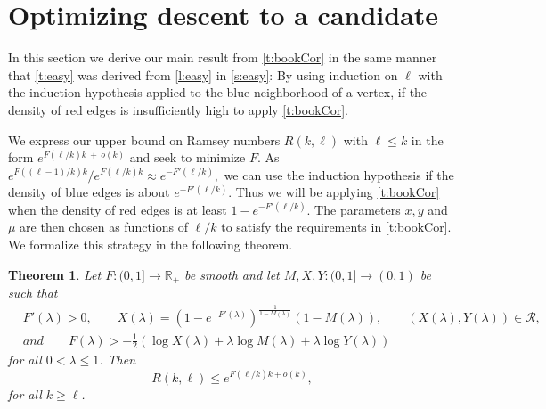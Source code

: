 \documentclass[reqno,final,12pt]{amsart}
\newtheorem{thm}{Theorem}
\newcommand{\mc}[1]{\mathcal{#1}}
\newcommand{\bb}[1]{\mathbb{#1}}
\newcommand{\s}[1]{\left(#1\right)}
\begin{document}
\section{Optimizing descent to a candidate}\label{s:opt}


In this section we derive our main result from \cref{t:bookCor} in the same manner that \cref{t:easy} was derived from \cref{l:easy} in \cref{s:easy}: By using induction on $\ell$ with the induction hypothesis applied to the blue neighborhood of a vertex, if the density of red edges is insufficiently high to apply  \cref{t:bookCor}.

We express our upper bound on Ramsey numbers $R(k,\ell)$ with $\ell \leq k$ in the form $e^{F(\ell/k)k~+~o(k)}$ and seek to minimize $F$. As $e^{F((\ell-1)/k)k}/e^{F(\ell/k)k} \approx e^{-F'(\ell/k)},$ we can use the induction hypothesis  if the density of blue edges is about $e^{-F'(\ell/k)}$. Thus we will be applying  \cref{t:bookCor} when the density of red edges is at least $1 - e^{-F'(\ell/k)}$. The parameters $x, y$ and $\mu$ are then chosen as functions of $\ell/k$ to satisfy the requirements in \cref{t:bookCor}. We formalize this strategy in the following theorem.

\begin{thm}\label{t:general}
	Let $F:(0,1] \to \bb{R}_+$ be smooth and let $M,X,Y:(0,1] \to (0,1)$ be such that  
	\begin{align*} &F'(\lambda) > 0, \qquad  X(\lambda) = (1 - e^{-F'(\lambda)})^{\frac{1}{1-M(\lambda)}}(1-M(\lambda)), \qquad (X(\lambda),Y(\lambda)) \in \mc{R},
\\ & and  \qquad F(\lambda) > -\frac{1}{2} \s{\log X(\lambda)+ \lambda \log M(\lambda) + \lambda\log Y(\lambda)} \end{align*}
for all $0< \lambda \leq 1$. 
Then $$R(k,\ell) \leq e^{F(\ell/k)k + o(k)},$$	
	for all $k \geq \ell$.
\end{thm}
\end{document}
